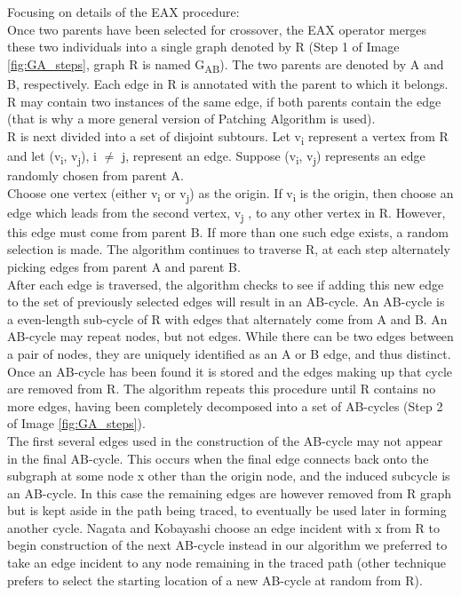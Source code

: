 Focusing on details of the EAX procedure:\\
Once two parents have been selected for crossover, the EAX operator merges these two individuals into a single graph denoted by R (Step 1 of Image \ref{fig:GA_steps}, graph R is named G\textsubscript{AB}). The two parents are denoted by A and B, respectively. Each edge in R is annotated with the parent to which it belongs. R may contain two instances of the same edge, if both parents contain the edge (that is why a more general version of Patching Algorithm is used).\\
R is next divided into a set of disjoint subtours. Let v\textsubscript{i} represent a vertex from R and let (v\textsubscript{i},  v\textsubscript{j}), i $\neq$ j, represent an edge. Suppose (v\textsubscript{i},  v\textsubscript{j}) represents an edge randomly chosen from parent A.\\
Choose one vertex (either v\textsubscript{i} or v\textsubscript{j}) as the origin. If v\textsubscript{i} is the origin, then choose an edge which leads from the second vertex, v\textsubscript{j} , to any other vertex in R. However, this edge must come from parent B. If more than one such edge exists, a random selection is made. The algorithm continues to traverse R, at each step alternately picking edges from parent A and parent B.\\
After each edge is traversed, the algorithm checks to see if adding this new edge to the set of previously selected edges will result in an AB-cycle. An AB-cycle is a even-length sub-cycle of R with edges that alternately come from A and B. An AB-cycle may repeat nodes, but not edges. While there can be two edges between a pair of nodes, they are uniquely identified as an A or B edge, and thus distinct.\\
Once an AB-cycle has been found it is stored and the edges making up that cycle are removed from R. The algorithm repeats this procedure until R contains no more edges, having been completely decomposed into a set of AB-cycles (Step 2 of Image \ref{fig:GA_steps}). \\
The first several edges used in the construction of the AB-cycle may not appear in the final AB-cycle. This occurs when the final edge connects back onto the subgraph at some node x other than the origin node, and the induced subcycle is an AB-cycle. In this case the remaining edges are however removed from R graph but is kept aside in the path being traced, to eventually be used later in forming another cycle. Nagata and Kobayashi choose an edge incident with x from R to begin construction of the next AB-cycle instead in our algorithm we preferred to take an edge incident to any node remaining in the traced path (other technique prefers to select the starting location of a new AB-cycle at random from R).
